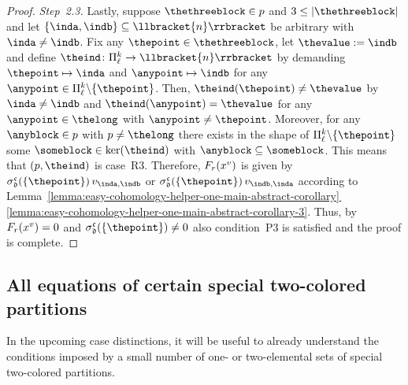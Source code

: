 \documentclass[10pt,a4paper]{amsart}
\numberwithin{equation}{section}
\newcommand{\thefuncxx}[2]{F_{#1}(#2)}
\newcommand{\funcdef}{\colon}
\newcommand{\dwi}[1]{\llbracket{#1}\rrbracket}
\newcommand{\subproof}[1]{\textit{#1}}
\newcommand{\tsopx}[2]{\Pi^{#1}_{#2}}
\newcommand{\csx}[3]{\sigma^{#1}_{#2}(#3)}
\newcommand{\Yc}[1]{\mathfrak{#1}}
\newcommand{\kerp}[1]{\ker(#1)}
\newcommand{\thedim}{n}
\newcommand{\scenariothree}{R3}
\newcommand{\conditionthree}{P3}
\begin{document}
{\begin{proof}
                \subproof{Step~2.3.}                 Lastly, suppose  $\thethreeblock\in\thepartition$ and $3\leq|\thethreeblock|$ and let  $\{\inda,\indb\}\subseteq \dwi{\thedim}$  be arbitrary with $\inda\neq \indb$. Fix any $\thepoint\in\thethreeblock$, let $\thevalue:= \indb$ and define $\theind\funcdef\tsopx{\inlen}{\outlen}\to\dwi{\thedim}$ by demanding $\thepoint\mapsto \inda$ and $\anypoint\mapsto \indb$ for any $\anypoint\in\tsopx{\inlen}{\outlen}\backslash \{\thepoint\}$. Then, $\theind(\thepoint)\neq \thevalue$ by $\inda\neq\indb$ and $\theind(\anypoint)=\thevalue$ for any $\anypoint\in\thelong$ with $\anypoint\neq\thepoint$. Moreover, for any $\anyblock\in\thepartition$ with $\thepartition\neq\thelong$ there exists in the shape of $\tsopx{\inlen}{\outlen}\backslash \{\thepoint\}$ some   $\someblock\in\kerp{\theind}$ with $\anyblock\subseteq\someblock$. This means that $(\thepartition,\theind)$ is case~\scenariothree{}. Therefore, $\thefuncxx{\somerel}{\thetuple}$ is given by $\csx{\incol}{\outcol}{\{\thepoint\}}\,\thematx{\inda}{\indb}$ or      $\csx{\incol}{\outcol}{\{\thepoint\}}\,\thematx{\indb}{\inda}$ according to  Lem\-ma~\hyperref[lemma:easy-cohomology-helper-one-main-abstract-corollary-3]{\ref*{lemma:easy-cohomology-helper-one-main-abstract-corollary}\,\ref*{lemma:easy-cohomology-helper-one-main-abstract-corollary-3}}. Thus,  by $\thefuncxx{\somerel}{\thetuple}= 0$ and $\csx{\incol}{\outcol}{\{\thepoint\}}\neq 0$ also  condition~\conditionthree{} is satisfied and the proof is complete.
  \end{proof}
}



\subsection{All equations of certain special two-colored partitions}
\label{section:main-one-simplifications-fourth-simplification}
{
  \newcommand{\inlen}{k}
  \newcommand{\outlen}{\ell}
  \newcommand{\infree}{g}
  \newcommand{\outfree}{j}
  \newcommand{\altinfree}{g'}
  \newcommand{\altoutfree}{j'}
  \newcommand{\incol}{\Yc{c}}
  \newcommand{\outcol}{\Yc{d}}
  \newcommand{\thepartition}{p}
  \newcommand{\somerel}{r}
  \newcommand{\sometuple}{x}
    \newcommand{\themat}{v}
  \newcommand{\thematx}[2]{v_{#1,#2}}
  \newcommand{\thetuple}{x^\themat}
In the upcoming case distinctions, it will be useful to already  understand the conditions imposed by a small number of one- or two-elemental sets of special two-colored partitions.
}
\end{document}
